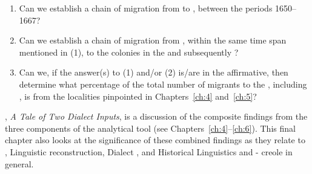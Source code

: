 \begin{enumerate}
\item Can we establish a chain of migration from  to , between the periods 1650--1667?
\item Can we establish a chain of migration from , within the same time span mentioned in (1), to the  colonies in the  and subsequently ?
\item Can we, if the answer(s) to (1) and/or (2) is/are in the affirmative, then determine what percentage of the total number of migrants to the , including , is from the localities pinpointed in Chapters~\ref{ch:4} and~\ref{ch:5}?
\end{enumerate}

, \emph{A Tale of Two Dialect Inputs}, is a discussion of the composite findings from the three components of the analytical tool (see Chapters~\ref{ch:4}--\ref{ch:6}). This final chapter also looks at the significance of these combined findings as they relate to , Linguistic reconstruction, Dialect ,  and Historical Linguistics and - creole  in general.
